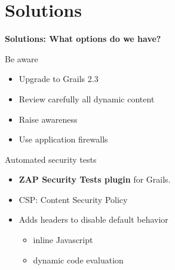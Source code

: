 
\section{Solutions}

\begin{frame}[plain]
    \begin{center}
      \Huge\bfseries
      Solutions: What options do we have?
    \end{center}
\end{frame}

\begin{frame}[plain]{Be aware}
  \begin{itemize}
    \item Upgrade to Grails 2.3
    \item Review carefully all dynamic content
    \item Raise awareness
    \item Use application firewalls
  \end{itemize}
\end{frame}

\begin{frame}[plain]{Automated security tests}
  \begin{itemize}
    \item \textbf{ZAP Security Tests plugin} for Grails.
  \end{itemize}

  \begin{center}
  \end{center}
\end{frame}

\begin{frame}[plain]
 \begin{itemize}
  \item CSP: Content Security Policy
  \item Adds headers to disable default behavior
   \begin{itemize}
     \item inline Javascript
     \item dynamic code evaluation
   \end{itemize}
 \end{itemize}
\end{frame}

